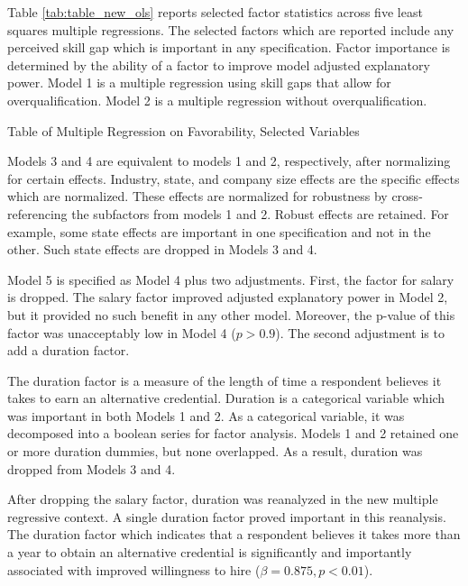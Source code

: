 \documentclass[review]{elsarticle}
\begin{document}
Table \ref{tab:table_new_ols} reports selected factor statistics across five least squares multiple regressions.
The selected factors which are reported include any perceived skill gap which is important in any specification.
Factor importance is determined by the ability of a factor to improve model adjusted explanatory power.
Model 1 is a multiple regression using skill gaps that allow for overqualification.
Model 2 is a multiple regression without overqualification.

\begin{table}
    \caption{Table of Multiple Regression on Favorability, Selected Variables}
    \resizebox{\columnwidth}{!}{
        
    }
    \label{tab:table_new_ols}
\end{table}

Models 3 and 4 are equivalent to models 1 and 2, respectively, after normalizing for certain effects.
Industry, state, and company size effects are the specific effects which are normalized.
These effects are normalized for robustness by cross-referencing the subfactors from models 1 and 2.
Robust effects are retained.
For example, some state effects are important in one specification and not in the other.
Such state effects are dropped in Models 3 and 4.

Model 5 is specified as Model 4 plus two adjustments.
First, the factor for salary is dropped.
The salary factor improved adjusted explanatory power in Model 2, but it provided no such benefit in any other model.
Moreover, the p-value of this factor was unacceptably low in Model 4 ($p > 0.9$).
The second adjustment is to add a duration factor.

The duration factor is a measure of the length of time a respondent believes it takes to earn an alternative credential.
Duration is a categorical variable which was important in both Models 1 and 2.
As a categorical variable, it was decomposed into a boolean series for factor analysis.
Models 1 and 2 retained one or more duration dummies, but none overlapped.
As a result, duration was dropped from Models 3 and 4.

After dropping the salary factor, duration was reanalyzed in the new multiple regressive context.
A single duration factor proved important in this reanalysis.
The duration factor which indicates that a respondent believes it takes more than a year to obtain an alternative credential
is significantly and importantly associated with improved willingness to hire ($\beta = 0.875, p < 0.01$).
\end{document}
